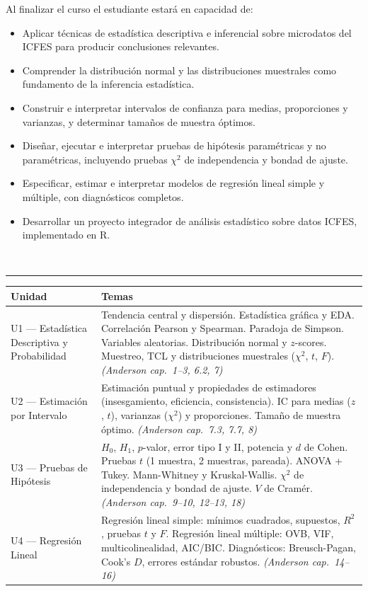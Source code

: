 \documentclass[11pt, a4paper]{article}
\newcommand{\sechead}[1]{%
  \vspace{10pt}%
  \noindent{\large\bfseries #1}\\[-6pt]%
  \rule{\linewidth}{0.5pt}%
  \vspace{2pt}%
}
\begin{document}
Al finalizar el curso el estudiante estar\'a en capacidad de:

\begin{itemize}
  \item Aplicar t\'ecnicas de estad\'istica descriptiva e inferencial sobre microdatos del ICFES para producir conclusiones relevantes.
  \item Comprender la distribuci\'on normal y las distribuciones muestrales como fundamento de la inferencia estad\'istica.
  \item Construir e interpretar intervalos de confianza para medias, proporciones y varianzas, y determinar tama\~nos de muestra \'optimos.
  \item Dise\~nar, ejecutar e interpretar pruebas de hip\'otesis param\'etricas y no param\'etricas, incluyendo pruebas $\chi^2$ de independencia y bondad de ajuste.
  \item Especificar, estimar e interpretar modelos de regresi\'on lineal simple y m\'ultiple, con diagn\'osticos completos.
  \item Desarrollar un proyecto integrador de an\'alisis estad\'istico sobre datos ICFES, implementado en R.
\end{itemize}

\sechead{Contenidos M\'inimos}

\begin{tabularx}{\linewidth}{L{3.5cm} X}
\toprule
\textbf{Unidad} & \textbf{Temas} \\
\midrule
U1 --- Estad\'istica Descriptiva y Probabilidad &
  Tendencia central y dispersi\'on. Estad\'istica gr\'afica y EDA.
  Correlaci\'on Pearson y Spearman. Paradoja de Simpson.
  Variables aleatorias. Distribuci\'on normal y $z$-scores.
  Muestreo, TCL y distribuciones muestrales ($\chi^2$, $t$, $F$).
  \textit{(Anderson cap.\ 1--3, 6.2, 7)} \\[4pt]
U2 --- Estimaci\'on por Intervalo &
  Estimaci\'on puntual y propiedades de estimadores (insesgamiento, eficiencia, consistencia).
  IC para medias ($z$, $t$), varianzas ($\chi^2$) y proporciones.
  Tama\~no de muestra \'optimo.
  \textit{(Anderson cap.\ 7.3, 7.7, 8)} \\[4pt]
U3 --- Pruebas de Hip\'otesis &
  $H_0$, $H_1$, $p$-valor, error tipo I y II, potencia y $d$ de Cohen.
  Pruebas $t$ (1 muestra, 2 muestras, pareada). ANOVA + Tukey.
  Mann-Whitney y Kruskal-Wallis.
  $\chi^2$ de independencia y bondad de ajuste. $V$ de Cram\'er.
  \textit{(Anderson cap.\ 9--10, 12--13, 18)} \\[4pt]
U4 --- Regresi\'on Lineal &
  Regresi\'on lineal simple: m\'inimos cuadrados, supuestos, $R^2$, pruebas $t$ y $F$.
  Regresi\'on lineal m\'ultiple: OVB, VIF, multicolinealidad, AIC/BIC.
  Diagn\'osticos: Breusch-Pagan, Cook's $D$, errores est\'andar robustos.
  \textit{(Anderson cap.\ 14--16)} \\
\bottomrule
\end{tabularx}
\end{document}
